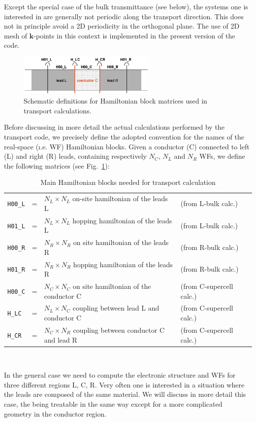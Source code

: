 Except the special case of the bulk transmittance (see below), the systems one is
interested in are generally not periodic along the transport direction. This does not
in principle avoid a 2D periodicity in the orthogonal plane. The use of
2D mesh of $\mathbf{k}$-points in this context is implemented in the present
version of the code.  \\

%
%
\begin{figure}
   \centering
   \includegraphics[clip,width=0.6\textwidth]{lcr}
   \caption{Schematic definitions for Hamiltonian block matrices used in
        transport calculations. \label{fig:matrix_naming}}
\end{figure}
%
%
\noindent Before discussing in more detail the actual calculations
performed by the transport code, we precisely define the adopted
convention for the names of the real-space ({\i.e.} WF)
Hamiltonian blocks. Given a conductor (C) connected to left (L)
and right (R) leads, containing respectively $N_C$, $N_L$ and
$N_R$ WFs,
we define the following matrices (see Fig.~\ref{fig:matrix_naming}): \\

%
%
\begin{table}[h]
%
\begin{tabular}{lllll}
\texttt{H00\_L} &=& $N_L\times N_L$ on-site hamiltonian
of the leads L & (from L-bulk calc.)\\
\texttt{H01\_L} &=& $N_L\times N_L$ hopping hamiltonian
of the leads L & (from L-bulk calc.) \\
\texttt{H00\_R} &=& $N_R\times N_R$ on site hamiltonian
of the leads R & (from R-bulk calc.) \\
\texttt{H01\_R} &=& $N_R\times N_R$ hopping hamiltonian
of the leads R & (from R-bulk calc.) \\
\texttt{H00\_C} &=& $N_C\times N_C$ on site hamiltonian
of the conductor C & (from C-supercell calc.) \\
\texttt{H\_LC}  &=& $N_L\times N_C$ coupling
between lead L and conductor C & (from C-supercell calc.) \\
\texttt{H\_CR}  &=& $N_C\times N_R$ coupling
between conductor C and lead R & (from C-supercell calc.)
%
%
\end{tabular} \\
%
\caption {Main Hamiltonian blocks needed for transport calculation
          \label{tab:hamiltonian_blocks} }
\end{table}
%
%
%
\noindent In the general case we need to compute the electronic
structure and WFs for three different regions L, C, R. Very often
one is interested in a situation where the leads are composed of
the same material. We will discuss in more detail this case, the
being treatable in the same way except for a more complicated
geometry in the conductor region.

